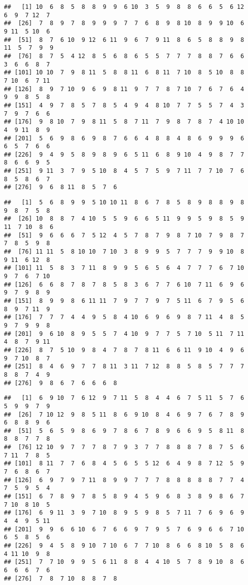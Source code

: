 \documentclass[
  xelatex,ja=standard]{bxjsarticle}
\begin{document}
\begin{verbatim}
##   [1] 10  6  8  5  8  8  9  9  6 10  3  5  9  8  8  6  6  5  6 12  6  9  7 12  7
##  [26]  7  8  9  7  8  9  9  9  7  7  6  8  9  8 10  8  9  9 10  6  9 11  5 10  6
##  [51]  8  7  6 10  9 12  6 11  9  6  7  9 11  8  6  5  8  8  9  8 11  5  7  9  9
##  [76]  8  7  5  4 12  8  5  6  8  6  5  5  7  7  7  8  8  7  6  6  3  6  6  8  7
## [101] 10 10  7  9  8 11  5  8  8 11  6  8 11  7 10  8  5 10  8  8  7 10  6  7 11
## [126]  8  9  7 10  9  6  9  8 11  9  7  7  8  7 10  7  6  7  6  4  9  9  8  5  8
## [151]  4  9  7  8  5  7  8  5  4  9  4  8 10  7  7  5  5  7  4  3  7  9  7  6  6
## [176]  9  8 10  7  9  8 11  5  8  7 11  7  9  8  7  8  7  4 10 10  4  9 11  8  9
## [201]  5  6  9  8  6  9  8  7  6  6  4  8  8  4  8  6  9  9  9  6  6  5  7  6  6
## [226]  9  4  9  5  8  9  8  9  6  5 11  6  8  9 10  4  9  8  7  7  8  6  6  9  5
## [251]  9 11  3  7  9  5 10  8  4  5  7  5  9  7 11  7  7 10  7  6  8  5  8  6  7
## [276]  9  6  8 11  8  5  7  6
\end{verbatim}

\begin{verbatim}
##   [1]  5  6  8  9  9  5 10 10 11  8  6  7  8  5  8  9  8  8  9  8  9  8  7  5  8
##  [26] 10  8  8  7  4 10  5  5  9  6  6  5 11  9  9  5  9  8  5  9 11  7 10  8  6
##  [51]  9  6  6  6  7  5 12  4  5  7  8  7  9  8  7 10  7  9  8  7  7  8  5  9  8
##  [76] 11 11  5  8 10 10  7 10  3  8  9  9  5  7  7  7  9  9 10  8  9 11  6 12  8
## [101] 11  5  8  3  7 11  8  9  9  5  6  5  6  4  7  7  7  6  7 10  9  7  6  7 10
## [126]  6  6  8  7  8  7  8  5  8  3  6  7  7  6 10  7 11  6  9  6  9  7  9  8  9
## [151]  8  9  9  8  6 11 11  7  9  7  7  9  7  5 11  6  7  9  5  6  8  9  7 11  9
## [176]  7  7  7  4  4  9  5  8  4 10  6  9  6  9  8  7 11  4  8  5  9  7  9  9  8
## [201]  9  6 10  8  9  5  5  7  4 10  9  7  7  5  7 10  5 11  7 11  4  8  7  9 11
## [226]  8  7  5 10  9  8  4  7  8  7  8 11  6  6 11  9 10  4  9  6  9  7 10  8  7
## [251]  8  4  6  9  7  7  8 11  3 11  7 12  8  8  5  8  5  7  7  7  8  8  7  4  9
## [276]  9  8  6  7  6  6  6  8
\end{verbatim}

\begin{verbatim}
##   [1]  6  9 10  7  6 12  9  7 11  5  8  4  4  6  7  5 11  5  7  6  5  9  9  7  9
##  [26]  7 10 12  9  8  5 11  8  6  9 10  8  4  6  9  7  6  7  8  9  6  8  8  9  6
##  [51]  5  6  5  9  8  6  9  7  8  6  7  8  9  6  6  9  5  8 11  8  8  8  7  7  8
##  [76] 12 10  9  7  7  7  8  7  9  3  7  7  8  8  8  7  8  7  5  6  7 11  7  8  5
## [101]  8 11  7  7  6  8  4  5  6  5  5 12  6  4  9  8  7 12  5  9  7  6  8  6  7
## [126]  6  9  7  9  7 11  8  9  9  7  7  7  8  8  8  8  8  7  7  4  7  5  9  5  4
## [151]  6  7  8  9  7  8  5  8  9  4  5  9  6  8  3  8  9  8  6  7  7 10  8 10  5
## [176]  6  9 11  3  9  7 10  8  9  5  9  8  5  7 11  7  6  9  6  9  4  4  9  5 11
## [201]  9  9  6  6 10  6  7  6  6  9  7  9  5  7  6  9  6  6  7 10  6  5  8  5  6
## [226]  9  4  5  8  9 10  7 10  6  7  7 10  8  6  6  8 10  5  8  6  4 11 10  9  8
## [251]  7  7 10  9  9  5  6 11  8  8  4  4 10  5  7  8  9 10  8  6  6  6  6  7  6
## [276]  7  8  7 10  8  8  7  8
\end{verbatim}
\end{document}
